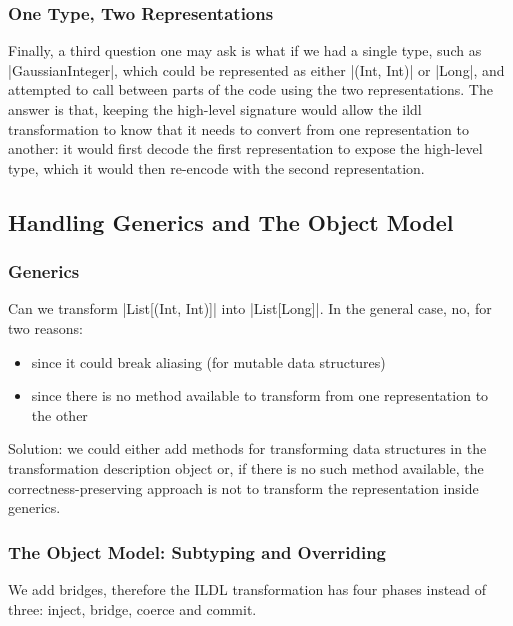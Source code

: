 \subsubsection{One Type, Two Representations}

Finally, a third question one may ask is what if we had a single type, such as |GaussianInteger|, which could be represented as either |(Int, Int)| or |Long|, and attempted to call between parts of the code using the two representations. The answer is that, keeping the high-level signature would allow the ildl transformation to know that it needs to convert from one representation to another: it would first decode the first representation to expose the high-level type, which it would then re-encode with the second representation.


\subsection{Handling Generics and The Object Model}
\label{sec:ildl:generics}

\subsubsection{Generics}

Can we transform |List[(Int, Int)]| into |List[Long]|. In the general case, no, for two reasons:
\begin{itemize}
  \item since it could break aliasing (for mutable data structures)
  \item since there is no method available to transform from one representation to the other
\end{itemize}

Solution: we could either add methods for transforming data structures in the transformation description object or, if there is no such method available, the correctness-preserving approach is not to transform the representation inside generics.


\subsubsection{The Object Model: Subtyping and Overriding}
We add bridges, therefore the ILDL transformation has four phases instead of three: inject, bridge, coerce and commit.

